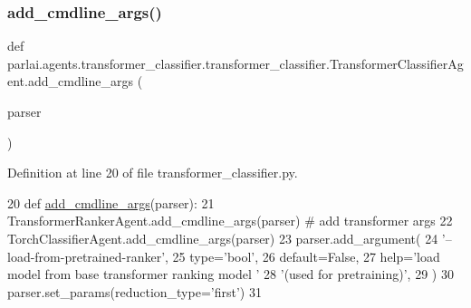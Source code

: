 \subsubsection{\texorpdfstring{add\+\_\+cmdline\+\_\+args()}{add\_cmdline\_args()}}
{\footnotesize\ttfamily def parlai.\+agents.\+transformer\+\_\+classifier.\+transformer\+\_\+classifier.\+Transformer\+Classifier\+Agent.\+add\+\_\+cmdline\+\_\+args (\begin{DoxyParamCaption}\item[{}]{parser }\end{DoxyParamCaption})\hspace{0.3cm}{\ttfamily [static]}}



Definition at line 20 of file transformer\+\_\+classifier.\+py.


\begin{DoxyCode}
20     \textcolor{keyword}{def }\hyperlink{namespaceparlai_1_1agents_1_1drqa_1_1config_a62fdd5554f1da6be0cba185271058320}{add\_cmdline\_args}(parser):
21         TransformerRankerAgent.add\_cmdline\_args(parser)  \textcolor{comment}{# add transformer args}
22         TorchClassifierAgent.add\_cmdline\_args(parser)
23         parser.add\_argument(
24             \textcolor{stringliteral}{'--load-from-pretrained-ranker'},
25             type=\textcolor{stringliteral}{'bool'},
26             default=\textcolor{keyword}{False},
27             help=\textcolor{stringliteral}{'load model from base transformer ranking model '}
28             \textcolor{stringliteral}{'(used for pretraining)'},
29         )
30         parser.set\_params(reduction\_type=\textcolor{stringliteral}{'first'})
31 
\end{DoxyCode}
\mbox{\label{classparlai_1_1agents_1_1transformer__classifier_1_1transformer__classifier_1_1TransformerClassifierAgent_a10a0e65863e4e7b6a0ac30d3ff6f3c5f}} 
